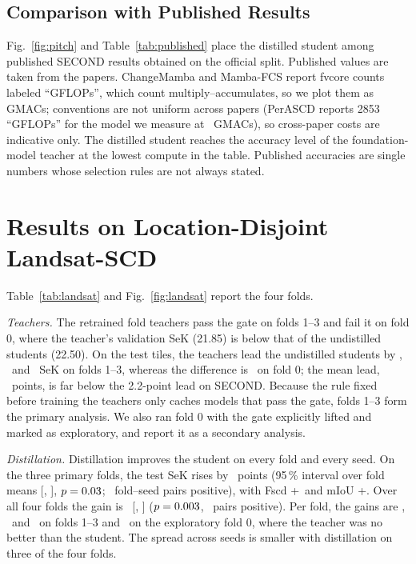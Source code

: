 \documentclass[journal]{IEEEtran}
\begin{document}


\subsection{Comparison with Published Results}
Fig.~\ref{fig:pitch} and Table~\ref{tab:published} place the distilled student among published
SECOND results obtained on the official split. Published values are taken from the papers.
ChangeMamba and Mamba-FCS report fvcore counts labeled ``GFLOPs'', which count
multiply--accumulates, so we plot them as GMACs; conventions are not uniform across papers
(PerASCD reports 2853 ``GFLOPs'' for the model we measure at \TeacherGmacs\ GMACs), so cross-paper
costs are indicative only. The distilled student reaches the accuracy level of the foundation-model
teacher at the lowest compute in the table. Published accuracies are single numbers whose
selection rules are not always stated.



\section{Results on Location-Disjoint Landsat-SCD}
\label{sec:landsat}

Table~\ref{tab:landsat} and Fig.~\ref{fig:landsat} report the four folds.

\emph{Teachers.} The retrained fold teachers pass the gate on folds 1--3 and fail
it on fold 0, where the teacher's validation SeK (21.85) is below that of the undistilled
students (22.50). On the test tiles, the teachers lead the undistilled students by \FOneTMinusB,
\FTwoTMinusB\ and \FThreeTMinusB\ SeK on folds 1--3, whereas the difference is \FZeroTMinusB\ on
fold 0; the mean lead, \LTeacherMinusBMean\ points, is far below the 2.2-point lead on SECOND. Because the rule fixed before training the teachers
only caches models that pass the gate, folds 1--3 form the primary analysis. We also ran fold 0 with the gate explicitly lifted and
marked as exploratory, and report it as a secondary analysis.

\emph{Distillation.} Distillation improves the student on every fold and every seed. On the
three primary folds, the test SeK rises by \LPrimGain\ points (95\,\% interval over fold means
[\LPrimGainLo, \LPrimGainHi], $p=0.03$; \LPrimPos\ fold--seed pairs positive), with Fscd +\LPrimFscd\ and mIoU +\LPrimMiou. Over all four folds the gain is
\LSecGain\ [\LSecGainLo, \LSecGainHi] ($p=0.003$, \LSecPos\ pairs positive). Per fold, the
gains are \FOneGain, \FTwoGain\ and \FThreeGain\ on folds 1--3 and \FZeroGain\ on the exploratory
fold 0, where the teacher was no better than the student. The spread across seeds is smaller with distillation on three of the four
folds.
\end{document}
